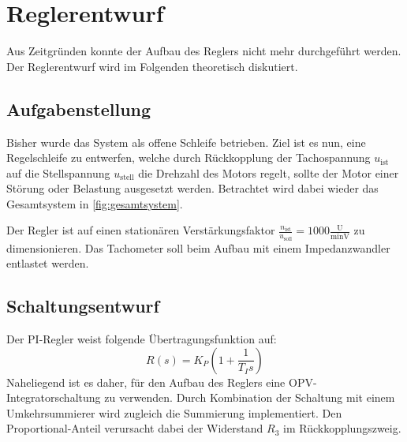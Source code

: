 \newpage
\section{Reglerentwurf}\label{sec:reglerentwurf}

\begin{alertblock}
Aus Zeitgründen konnte der Aufbau des Reglers nicht mehr durchgeführt werden. Der Reglerentwurf wird im Folgenden theoretisch diskutiert.
\end{alertblock}

\subsection{Aufgabenstellung}

Bisher wurde das System als offene Schleife betrieben. Ziel ist es nun, eine Regelschleife zu entwerfen, welche durch Rückkopplung der Tachospannung $u_\mathrm{ist}$ auf die Stellspannung $u_\mathrm{stell}$ die Drehzahl des Motors regelt, sollte der Motor einer Störung oder Belastung ausgesetzt werden. Betrachtet wird dabei wieder das Gesamtsystem in \autoref{fig:gesamtsystem}.

Der Regler ist auf einen stationären Verstärkungsfaktor $\frac{n_\text{ist}}{u_\text{soll}} = 1000\frac{\mathrm{U}}{\si{\minute\volt}}$ zu dimensionieren. Das Tachometer soll beim Aufbau mit einem Impedanzwandler entlastet werden.

\subsection{Schaltungsentwurf}

Der PI-Regler weist folgende Übertragungsfunktion auf:
\begin{equation}
R(s) = K_P \left( 1 + \frac{1}{T_I s} \right)\label{eq:pi-regler}
\end{equation}
Naheliegend ist es daher, für den Aufbau des Reglers eine OPV-Integratorschaltung zu verwenden. Durch Kombination der Schaltung mit einem Umkehrsummierer wird zugleich die Summierung implementiert. Den Proportional-Anteil verursacht dabei der Widerstand $R_3$ im Rückkopplungszweig.

